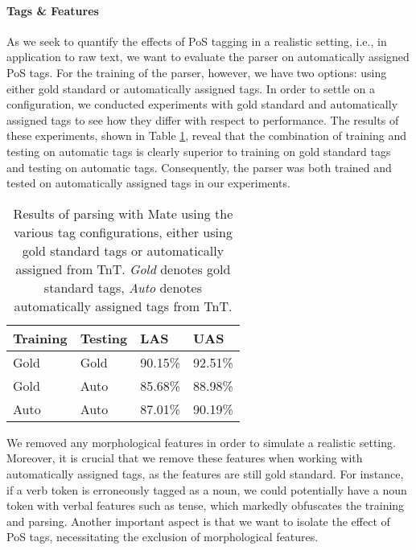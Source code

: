 \documentclass[11pt,a4paper]{article}
\begin{document}
\paragraph{Tags \& Features}
As we seek to quantify the effects of PoS tagging in a realistic setting, i.e.,
in application to raw text, we want to evaluate the parser on automatically
assigned PoS tags. For the training of the parser, however, we have two
options: using either gold standard or automatically assigned tags. In order to
settle on a configuration, we conducted experiments with gold standard and
automatically assigned tags to see how they differ with respect to performance.
The results of these experiments, shown in Table \ref{tagconfigeval}, reveal that
the combination of training and testing on automatic tags is clearly superior
to training on gold standard tags and testing on automatic tags. Consequently,
the parser was both trained and tested on automatically assigned tags in our
experiments.

\begin{table}
    \centering
    \smaller[0.5]
    \begin{tabular}{@{}llll@{}}
        \toprule
        \textbf{Training} & \textbf{Testing} & \textbf{LAS} & \textbf{UAS} \\
        \midrule
        Gold & Gold & 90.15\% & 92.51\% \\
        Gold & Auto & 85.68\% & 88.98\% \\
        Auto & Auto & 87.01\% & 90.19\% \\
        \bottomrule
    \end{tabular}
    \caption{Results of parsing with Mate using the various tag configurations,
        either using gold standard tags or automatically assigned from TnT.
        \emph{Gold} denotes gold standard tags, \emph{Auto} denotes
        automatically assigned tags from TnT.}
    \label{tagconfigeval}
\end{table}

We removed any morphological features in order to simulate a realistic setting.
Moreover, it is crucial that we remove these features when working with
automatically assigned tags, as the features are still gold standard. For
instance, if a verb token is erroneously tagged as a noun, we could potentially
have a noun token with verbal features such as tense, which markedly obfuscates
the training and parsing. Another important aspect is that we want to isolate
the effect of PoS tags, necessitating the exclusion of morphological features.
\end{document}
